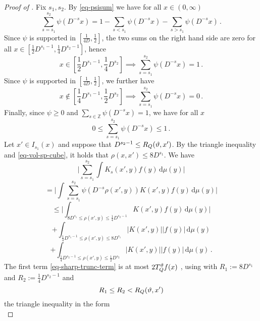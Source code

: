 \begin{proof}[Proof of ]
    Fix $s_1, s_2$. By \eqref{eq-psisum} we have for all $x \in (0, \infty)$
    $$
        \sum_{s = s_1}^{s_2} \psi(D^{-s}x) = 1 - \sum_{s < s_1} \psi(D^{-s}x) - \sum_{s > s_1} \psi(D^{-s}x)\,.
    $$
    Since $\psi$ is supported in $[\frac{1}{4D}, \frac{1}{2}]$, the two sums on the right hand side are zero for all $x \in [\frac{1}{2}D^{s_1-1}, \frac{1}{4} D^{s_2 - 1}]$, hence
    $$
        x \in [\frac{1}{2}D^{s_1-1}, \frac{1}{4} D^{s_2}] \implies \sum_{s = s_1}^{s_2} \psi(D^{-s}x) = 1\,.
    $$
    Since $\psi$ is supported in $[\frac{1}{4D}, \frac{1}{2}]$, we further have
    $$
        x \notin [\frac{1}{4}D^{s_1 - 1}, \frac{1}{2}D^{s_2}] \implies \sum_{s = s_1}^{s_2} \psi(D^{-s}x) = 0\,.
    $$
    Finally, since $\psi \ge 0$ and $\sum_{s \in \mathbb{Z}} \psi(D^{-s}x) = 1$, we have for all $x$
    $$
        0 \le \sum_{s = s_1}^{s_2} \psi(D^{-s}x) \le 1\,.
    $$
    Let $x' \in I_{s_1}(x)$ and suppose that $D^{s_2 - 1} \le R_Q({\vartheta}, x')$. By the triangle inequality and \eqref{eq-vol-sp-cube}, it holds that $\rho(x,x') \le 8D^{s_1}$. We have
    $$
        \Bigg|\sum_{s = s_1}^{s_2} \int K_s(x',y) f(y) \, \mathrm{d}\mu(y)\Bigg|
    $$
    $$
        = \Bigg|\int \sum_{s = s_1}^{s_2} \psi(D^{-s}\rho(x',y)) K(x',y) f(y) \, \mathrm{d}\mu(y)\Bigg|
    $$
    \begin{equation}
        \label{eq-sharp-trunc-term}
        \le \Bigg| \int_{8D^{s_1} \le \rho(x',y) \le \frac{1}{4}D^{s_2-1}} K(x',y) f(y) \, \mathrm{d}\mu(y) \Bigg|
    \end{equation}
    \begin{equation}
        \label{eq-lower-bound-term}
        + \int_{\frac{1}{4}D^{s_1-1} \le \rho(x',y) \le 8D^{s_1}} |K(x', y)| |f(y)| \, \mathrm{d}\mu(y)
    \end{equation}
    \begin{equation}
        \label{eq-upper-bound-term}
        + \int_{\frac{1}{4}D^{s_2-1} \le \rho(x',y) \le \frac{1}{2}D^{s_2}} |K(x', y)| |f(y)| \, \mathrm{d}\mu(y)\,.
    \end{equation}
    The first term \eqref{eq-sharp-trunc-term} is at most
     $2T_{{Q}}^{\vartheta} f(x)$ ,
    using with $R_1:=8D^{s_1}$ and
    $R_2:=\frac{1}{4}D^{s_2-1}$
    and
    \begin{equation}
        R_1 \le  R_2<R_{{Q}}({\vartheta},x')
    \end{equation}
    the triangle inequality in the form
    \begin{equation}

\end{equation}
\end{proof}
